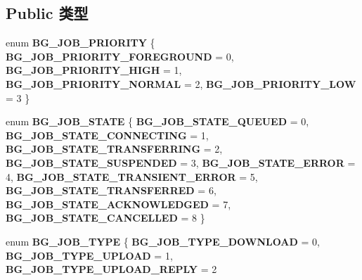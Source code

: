 \subsection*{Public 类型}
\begin{DoxyCompactItemize}
\item 
\mbox{\label{interface_i_background_copy_job_af32afd85fe2cdf33eacba4c1df2bedeb}} 
enum {\bfseries B\+G\+\_\+\+J\+O\+B\+\_\+\+P\+R\+I\+O\+R\+I\+TY} \{ {\bfseries B\+G\+\_\+\+J\+O\+B\+\_\+\+P\+R\+I\+O\+R\+I\+T\+Y\+\_\+\+F\+O\+R\+E\+G\+R\+O\+U\+ND} = 0, 
{\bfseries B\+G\+\_\+\+J\+O\+B\+\_\+\+P\+R\+I\+O\+R\+I\+T\+Y\+\_\+\+H\+I\+GH} = 1, 
{\bfseries B\+G\+\_\+\+J\+O\+B\+\_\+\+P\+R\+I\+O\+R\+I\+T\+Y\+\_\+\+N\+O\+R\+M\+AL} = 2, 
{\bfseries B\+G\+\_\+\+J\+O\+B\+\_\+\+P\+R\+I\+O\+R\+I\+T\+Y\+\_\+\+L\+OW} = 3
 \}
\item 
\mbox{\label{interface_i_background_copy_job_a5ebaf030376dc7b68bdab4616ae299ba}} 
enum {\bfseries B\+G\+\_\+\+J\+O\+B\+\_\+\+S\+T\+A\+TE} \{ \newline
{\bfseries B\+G\+\_\+\+J\+O\+B\+\_\+\+S\+T\+A\+T\+E\+\_\+\+Q\+U\+E\+U\+ED} = 0, 
{\bfseries B\+G\+\_\+\+J\+O\+B\+\_\+\+S\+T\+A\+T\+E\+\_\+\+C\+O\+N\+N\+E\+C\+T\+I\+NG} = 1, 
{\bfseries B\+G\+\_\+\+J\+O\+B\+\_\+\+S\+T\+A\+T\+E\+\_\+\+T\+R\+A\+N\+S\+F\+E\+R\+R\+I\+NG} = 2, 
{\bfseries B\+G\+\_\+\+J\+O\+B\+\_\+\+S\+T\+A\+T\+E\+\_\+\+S\+U\+S\+P\+E\+N\+D\+ED} = 3, 
\newline
{\bfseries B\+G\+\_\+\+J\+O\+B\+\_\+\+S\+T\+A\+T\+E\+\_\+\+E\+R\+R\+OR} = 4, 
{\bfseries B\+G\+\_\+\+J\+O\+B\+\_\+\+S\+T\+A\+T\+E\+\_\+\+T\+R\+A\+N\+S\+I\+E\+N\+T\+\_\+\+E\+R\+R\+OR} = 5, 
{\bfseries B\+G\+\_\+\+J\+O\+B\+\_\+\+S\+T\+A\+T\+E\+\_\+\+T\+R\+A\+N\+S\+F\+E\+R\+R\+ED} = 6, 
{\bfseries B\+G\+\_\+\+J\+O\+B\+\_\+\+S\+T\+A\+T\+E\+\_\+\+A\+C\+K\+N\+O\+W\+L\+E\+D\+G\+ED} = 7, 
\newline
{\bfseries B\+G\+\_\+\+J\+O\+B\+\_\+\+S\+T\+A\+T\+E\+\_\+\+C\+A\+N\+C\+E\+L\+L\+ED} = 8
 \}
\item 
\mbox{\label{interface_i_background_copy_job_a65f03a5cf253aed6d10aeeb7b3a59a86}} 
enum {\bfseries B\+G\+\_\+\+J\+O\+B\+\_\+\+T\+Y\+PE} \{ {\bfseries B\+G\+\_\+\+J\+O\+B\+\_\+\+T\+Y\+P\+E\+\_\+\+D\+O\+W\+N\+L\+O\+AD} = 0, 
{\bfseries B\+G\+\_\+\+J\+O\+B\+\_\+\+T\+Y\+P\+E\+\_\+\+U\+P\+L\+O\+AD} = 1, 
{\bfseries B\+G\+\_\+\+J\+O\+B\+\_\+\+T\+Y\+P\+E\+\_\+\+U\+P\+L\+O\+A\+D\+\_\+\+R\+E\+P\+LY} = 2

\end{DoxyCompactItemize}

